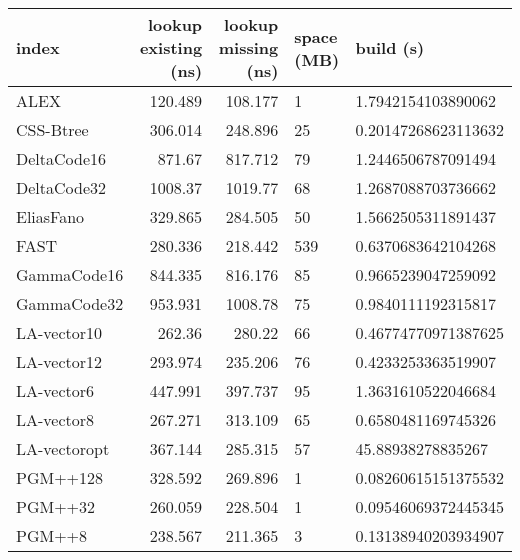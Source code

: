 \begin{tabular}{lrrll}
\hline
 index             &   lookup existing (ns) &   lookup missing (ns) & space (MB)   & build (s)             \\
\hline
 ALEX              &               120.489  &              108.177  & 1            & 1.7942154103890062    \\
 CSS-Btree         &               306.014  &              248.896  & 25           & 0.20147268623113632   \\
 DeltaCode16       &               871.67   &              817.712  & 79           & 1.2446506787091494    \\
 DeltaCode32       &              1008.37   &             1019.77   & 68           & 1.2687088703736662    \\
 EliasFano         &               329.865  &              284.505  & 50           & 1.5662505311891437    \\
 FAST              &               280.336  &              218.442  & 539          & 0.6370683642104268    \\
 GammaCode16       &               844.335  &              816.176  & 85           & 0.9665239047259092    \\
 GammaCode32       &               953.931  &             1008.78   & 75           & 0.9840111192315817    \\
 LA-vector10       &               262.36   &              280.22   & 66           & 0.46774770971387625   \\
 LA-vector12       &               293.974  &              235.206  & 76           & 0.4233253363519907    \\
 LA-vector6        &               447.991  &              397.737  & 95           & 1.3631610522046684    \\
 LA-vector8        &               267.271  &              313.109  & 65           & 0.6580481169745326    \\
 LA-vectoropt      &               367.144  &              285.315  & 57           & 45.88938278835267     \\
 PGM++128          &               328.592  &              269.896  & 1            & 0.08260615151375532   \\
 PGM++32           &               260.059  &              228.504  & 1            & 0.09546069372445345   \\
 PGM++8            &               238.567  &              211.365  & 3            & 0.13138940203934907   \\

\end{tabular}
